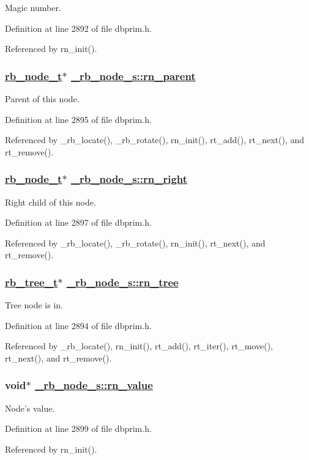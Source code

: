 Magic number. 

Definition at line 2892 of file dbprim.h.

Referenced by rn\_\-init().\hypertarget{struct__rb__node__s_o3}{
\subsubsection[rn\_\-parent]{\setlength{\rightskip}{0pt plus 5cm}\hyperlink{struct__rb__node__s}{rb\_\-node\_\-t}$\ast$ \hyperlink{struct__rb__node__s_o3}{\_\-rb\_\-node\_\-s::rn\_\-parent}}}
\label{struct__rb__node__s_o3}


Parent of this node. 

Definition at line 2895 of file dbprim.h.

Referenced by \_\-rb\_\-locate(), \_\-rb\_\-rotate(), rn\_\-init(), rt\_\-add(), rt\_\-next(), and rt\_\-remove().\hypertarget{struct__rb__node__s_o5}{
\subsubsection[rn\_\-right]{\setlength{\rightskip}{0pt plus 5cm}\hyperlink{struct__rb__node__s}{rb\_\-node\_\-t}$\ast$ \hyperlink{struct__rb__node__s_o5}{\_\-rb\_\-node\_\-s::rn\_\-right}}}
\label{struct__rb__node__s_o5}


Right child of this node. 

Definition at line 2897 of file dbprim.h.

Referenced by \_\-rb\_\-locate(), \_\-rb\_\-rotate(), rn\_\-init(), rt\_\-next(), and rt\_\-remove().\hypertarget{struct__rb__node__s_o2}{
\subsubsection[rn\_\-tree]{\setlength{\rightskip}{0pt plus 5cm}\hyperlink{struct__rb__tree__s}{rb\_\-tree\_\-t}$\ast$ \hyperlink{struct__rb__node__s_o2}{\_\-rb\_\-node\_\-s::rn\_\-tree}}}
\label{struct__rb__node__s_o2}


Tree node is in. 

Definition at line 2894 of file dbprim.h.

Referenced by \_\-rb\_\-locate(), rn\_\-init(), rt\_\-add(), rt\_\-iter(), rt\_\-move(), rt\_\-next(), and rt\_\-remove().\hypertarget{struct__rb__node__s_o7}{
\subsubsection[rn\_\-value]{\setlength{\rightskip}{0pt plus 5cm}void$\ast$ \hyperlink{struct__rb__node__s_o7}{\_\-rb\_\-node\_\-s::rn\_\-value}}}
\label{struct__rb__node__s_o7}


Node's value. 

Definition at line 2899 of file dbprim.h.

Referenced by rn\_\-init().